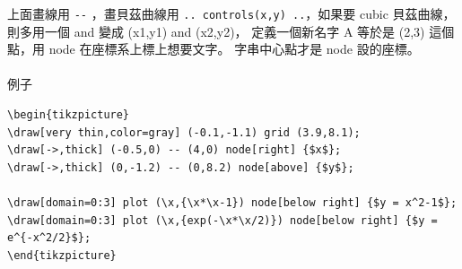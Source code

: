 上面畫線用 \verb=--=  ，畫貝茲曲線用 \verb=.. controls(x,y) ..=，如果要 cubic
貝茲曲線，則多用一個 and 變成 (x1,y1) and (x2,y2)， 定義一個新名字 A 等於是
(2,3) 這個點，用 node 在座標系上標上想要文字。 字串中心點才是 node 設的座標。
\\\\
例子
\begin{verbatim}
\begin{tikzpicture}
\draw[very thin,color=gray] (-0.1,-1.1) grid (3.9,8.1);
\draw[->,thick] (-0.5,0) -- (4,0) node[right] {$x$};
\draw[->,thick] (0,-1.2) -- (0,8.2) node[above] {$y$};

\draw[domain=0:3] plot (\x,{\x*\x-1}) node[below right] {$y = x^2-1$};
\draw[domain=0:3] plot (\x,{exp(-\x*\x/2)}) node[below right] {$y = e^{-x^2/2}$};
\end{tikzpicture}
\end{verbatim}


